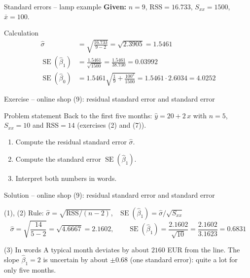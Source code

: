 \documentclass[aspectratio=169,11pt]{beamer}
\begin{document}
\begin{frame}{Standard errors -- lamp example}
  \textbf{Given:} $n=9$, $\text{RSS}=16.733$, $S_{xx}=1500$, $\bar x=100$.
  \begin{exampleblock}{Calculation}
    \begin{align*}
      \hat\sigma &= \sqrt{\frac{16.733}{9-2}}=\sqrt{2.3905}=\mathbf{1.5461}\\[3pt]
      \operatorname{SE}(\hat\beta_1) &= \frac{1.5461}{\sqrt{1500}}=\frac{1.5461}{38.730}=\mathbf{0.03992}\\[3pt]
      \operatorname{SE}(\hat\beta_0) &= 1.5461\sqrt{\frac19+\frac{100^2}{1500}}
                    =1.5461\cdot 2.6034=\mathbf{4.0252}
    \end{align*}
  \end{exampleblock}
\end{frame}

\begin{frame}{Exercise -- online shop (9): residual standard error and standard error}
  \begin{block}{Problem statement}
    Back to the first five months: $\hat{y} = 20 + 2\,x$ with $n = 5$,
    $S_{xx} = 10$ and $\text{RSS} = 14$ (exercises (2) and (7)).
    \begin{enumerate}
      \setlength{\itemsep}{2pt}
      \item Compute the residual standard error $\hat\sigma$.
      \item Compute the standard error $\operatorname{SE}(\hat\beta_1)$.
      \item Interpret both numbers in words.
    \end{enumerate}
  \end{block}
\end{frame}

\begin{frame}{Solution -- online shop (9): residual standard error and standard error}
  \begin{exampleblock}{(1), (2) Rule: $\hat\sigma = \sqrt{\text{RSS}/(n-2)}$, \ $\operatorname{SE}(\hat\beta_1) = \hat\sigma/\sqrt{S_{xx}}$}
    \[
      \hat\sigma = \sqrt{\frac{14}{5-2}} = \sqrt{4.6667} = \mathbf{2.1602},
      \qquad
      \operatorname{SE}(\hat\beta_1) = \frac{2.1602}{\sqrt{10}} = \frac{2.1602}{3.1623} = \mathbf{0.6831}
    \]
  \end{exampleblock}
  \begin{exampleblock}{(3) In words}
    A typical month deviates by about $2160$ EUR from the line. The slope
    $\hat\beta_1 = 2$ is uncertain by about $\pm 0.68$ (one standard error):
    quite a lot for only five months.
  \end{exampleblock}
\end{frame}
\end{document}
